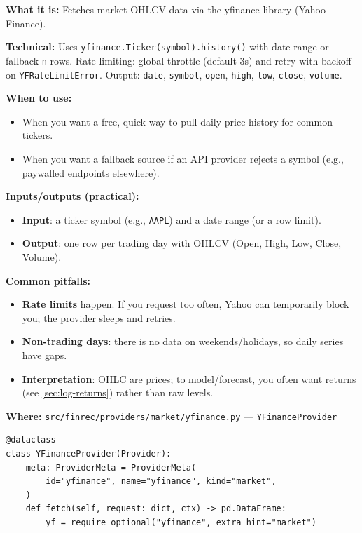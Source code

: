 \documentclass[11pt,a4paper]{article}
\begin{document}
\textbf{What it is:} Fetches market OHLCV data via the yfinance library (Yahoo Finance).

\textbf{Technical:} Uses \texttt{yfinance.Ticker(symbol).history()} with date range or fallback \texttt{n} rows. Rate limiting: global throttle (default 3s) and retry with backoff on \texttt{YFRateLimitError}. Output: \texttt{date}, \texttt{symbol}, \texttt{open}, \texttt{high}, \texttt{low}, \texttt{close}, \texttt{volume}.

\textbf{When to use:}
\begin{itemize}[leftmargin=2em]
  \item When you want a free, quick way to pull daily price history for common tickers.
  \item When you want a fallback source if an API provider rejects a symbol (e.g., paywalled endpoints elsewhere).
\end{itemize}

\textbf{Inputs/outputs (practical):}
\begin{itemize}[leftmargin=2em]
  \item \textbf{Input}: a ticker symbol (e.g., \texttt{AAPL}) and a date range (or a row limit).
  \item \textbf{Output}: one row per trading day with OHLCV (Open, High, Low, Close, Volume).
\end{itemize}

\textbf{Common pitfalls:}
\begin{itemize}[leftmargin=2em]
  \item \textbf{Rate limits} happen. If you request too often, Yahoo can temporarily block you; the provider sleeps and retries.
  \item \textbf{Non-trading days}: there is no data on weekends/holidays, so daily series have gaps.
  \item \textbf{Interpretation}: OHLC are prices; to model/forecast, you often want returns (see \ref{sec:log-returns}) rather than raw levels.
\end{itemize}

\textbf{Where:} \texttt{src/finrec/providers/market/yfinance.py} --- \texttt{YFinanceProvider}

\begin{lstlisting}
@dataclass
class YFinanceProvider(Provider):
    meta: ProviderMeta = ProviderMeta(
        id="yfinance", name="yfinance", kind="market",
    )
    def fetch(self, request: dict, ctx) -> pd.DataFrame:
        yf = require_optional("yfinance", extra_hint="market")
\end{lstlisting}
\end{document}
